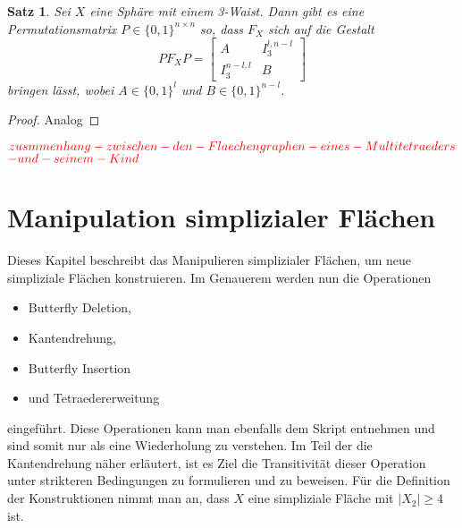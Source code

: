 \documentclass[12pt,titlepage,twoside,cleardoublepage]{article}
\theoremstyle{nummermitklammern}
\newtheorem{satz}[temp]{Satz}
\newtheorem{satz}[zahl]{Satz}
\numberwithin{equation}{section}
\begin{document}
\begin{satz}
Sei $X$ eine Sphäre mit einem 3-Waist. Dann gibt es eine Permutationsmatrix $P\in \{0,1\}^{n \times n}$ so, dass $F_X$ sich auf die Gestalt 
\[
PF_XP=
\left[ 
\begin{array}{c|c} 
  A & I^{l,n-l}_3 \\ 
  \hline 
  I^{n-l,l}_3 & B 
\end{array} 
\right]
\] 
bringen lässt, wobei $A\in \{0,1\}^{l}$ und $B\in \{0,1\}^{n-l}$.
\end{satz}
\begin{proof}

Analog
\end{proof}
$\textcolor{red}{zusmmenhang-zwischen-den-Flaechengraphen-eines-Multitetraeders}$ $\textcolor{red}{ -und-seinem-Kind}$

\section{Manipulation simplizialer Flächen}
Dieses Kapitel beschreibt das Manipulieren simplizialer Flächen, um neue simpliziale Flächen konstruieren. Im Genauerem werden nun die Operationen
\begin{itemize}
\item Butterfly Deletion,
\item Kantendrehung,
 \item Butterfly Insertion
 \item und Tetraedererweitung
\end{itemize} 
 eingeführt.
Diese Operationen kann man ebenfalls dem Skript entnehmen und sind somit nur als eine Wiederholung zu verstehen. Im Teil der die Kantendrehung näher erläutert, ist es Ziel die Transitivität dieser Operation unter strikteren Bedingungen zu formulieren und zu beweisen.
Für die Definition der Konstruktionen nimmt man an, dass $X$ eine simpliziale Fläche mit $\vert X_2 \vert \geq 4$ ist.

\end{document}
